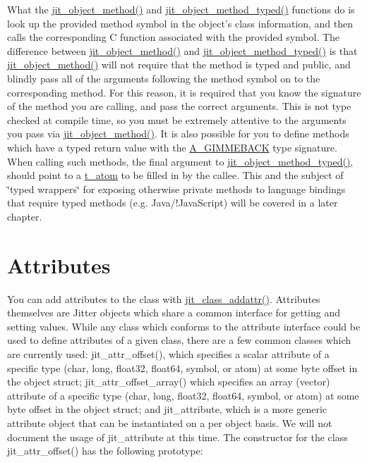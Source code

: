 What the \hyperlink{group__objectmod_ga9e1b9b8ed4fce611de26a74c6e1452c8}{jit\_\-object\_\-method()} and \hyperlink{group__objectmod_ga9c9b8591a887cddd19b313c8e995fbea}{jit\_\-object\_\-method\_\-typed()} functions do is look up the provided method symbol in the object's class information, and then calls the corresponding C function associated with the provided symbol. The difference between \hyperlink{group__objectmod_ga9e1b9b8ed4fce611de26a74c6e1452c8}{jit\_\-object\_\-method()} and \hyperlink{group__objectmod_ga9c9b8591a887cddd19b313c8e995fbea}{jit\_\-object\_\-method\_\-typed()} is that \hyperlink{group__objectmod_ga9e1b9b8ed4fce611de26a74c6e1452c8}{jit\_\-object\_\-method()} will not require that the method is typed and public, and blindly pass all of the arguments following the method symbol on to the corresponding method. For this reason, it is required that you know the signature of the method you are calling, and pass the correct arguments. This is not type checked at compile time, so you must be extremely attentive to the arguments you pass via \hyperlink{group__objectmod_ga9e1b9b8ed4fce611de26a74c6e1452c8}{jit\_\-object\_\-method()}. It is also possible for you to define methods which have a typed return value with the \hyperlink{group__atom_gga8aa6700e9f00b132eb376db6e39ade47ad150bf3de9c8dc2ddfa0ca0ca2382360}{A\_\-GIMMEBACK} type signature. When calling such methods, the final argument to \hyperlink{group__objectmod_ga9c9b8591a887cddd19b313c8e995fbea}{jit\_\-object\_\-method\_\-typed()}, should point to a \hyperlink{structt__atom}{t\_\-atom} to be filled in by the callee. This and the subject of \char`\"{}typed wrappers\char`\"{} for exposing otherwise private methods to language bindings that require typed methods (e.g. Java/!JavaScript) will be covered in a later chapter.\hypertarget{chapter_jit_objectmodel_chapter_jit_objectmodel_attrs}{}\section{Attributes}\label{chapter_jit_objectmodel_chapter_jit_objectmodel_attrs}
You can add attributes to the class with \hyperlink{group__classmod_ga37e39db544b4d73596da1557e6c7563a}{jit\_\-class\_\-addattr()}. Attributes themselves are Jitter objects which share a common interface for getting and setting values. While any class which conforms to the attribute interface could be used to define attributes of a given class, there are a few common classes which are currently used: jit\_\-attr\_\-offset(), which specifies a scalar attribute of a specific type (char, long, float32, float64, symbol, or atom) at some byte offset in the object struct; jit\_\-attr\_\-offset\_\-array() which specifies an array (vector) attribute of a specific type (char, long, float32, float64, symbol, or atom) at some byte offset in the object struct; and jit\_\-attribute, which is a more generic attribute object that can be instantiated on a per object basis. We will not document the usage of jit\_\-attribute at this time. The constructor for the class jit\_\-attr\_\-offset() has the following prototype:


